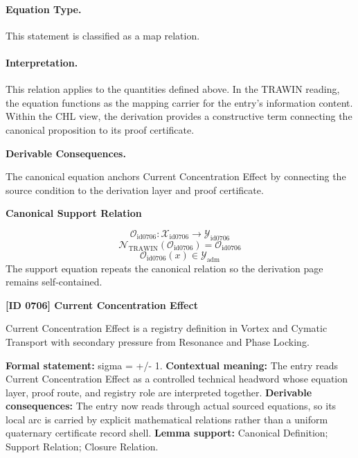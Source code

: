 \paragraph{Equation Type.}
This statement is classified as a map relation.

\paragraph{Interpretation.}
This relation applies to the quantities defined above. In the TRAWIN reading, the equation functions as the mapping carrier for the entry’s information content. Within the CHL view, the derivation provides a constructive term connecting the canonical proposition to its proof certificate.

\par\vspace{0.35em}
\noindent\textbf{Derivable Consequences.}\quad
\begingroup
\footnotesize
\raggedright
The canonical equation anchors Current Concentration Effect by connecting the source condition to the derivation layer and proof certificate.
\par\endgroup

\noindent\textbf{Canonical Support Relation}\par
\[
\mathcal{O}_{\mathrm{id0706}}:\mathcal{X}_{\mathrm{id0706}}\longrightarrow\mathcal{Y}_{\mathrm{id0706}}
\]
\[
\mathcal{N}_{\mathrm{TRAWIN}}(\mathcal{O}_{\mathrm{id0706}})=\mathcal{O}_{\mathrm{id0706}}
\]
\[
\mathcal{O}_{\mathrm{id0706}}(x)\in\mathcal{Y}_{\mathrm{adm}}
\]
\noindent The support equation repeats the canonical relation so the derivation page remains self-contained.\par

\clearpage
\noindent\textbf{[ID 0706] Current Concentration Effect}\par
\vspace{0.35em}
\begingroup\small
{}
Current Concentration Effect is a registry definition in Vortex and Cymatic Transport with secondary pressure from Resonance and Phase Locking.

\begingroup\footnotesize\setlength{\emergencystretch}{3em}\sloppy
\textbf{Formal statement:} sigma = +/- 1. \textbf{Contextual meaning:} The entry reads Current Concentration Effect as a controlled technical headword whose equation layer, proof route, and registry role are interpreted together. \textbf{Derivable consequences:} The entry now reads through actual sourced equations, so its local arc is carried by explicit mathematical relations rather than a uniform quaternary certificate record shell. \textbf{Lemma support:} Canonical Definition; Support Relation; Closure Relation.\par
\endgroup

